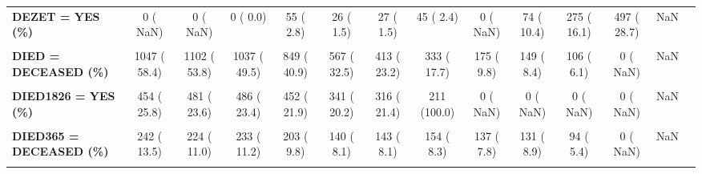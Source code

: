 \documentclass[
]{article}
\begin{document}
\begin{table}[H]
\begin{tabular}[t]{>{\raggedright\arraybackslash}p{5em}ccccccccccccc}
\textbf{DEZET = YES (\%)} & 0 (  NaN) & 0 (  NaN) & 0 (  0.0) & 55 (  2.8) & 26 (  1.5) & 27 (  1.5) & 45 (  2.4) & 0 (  NaN) & 74 ( 10.4) & 275 ( 16.1) & 497 ( 28.7) & NaN & \\
\textbf{\cellcolor{gray!10}{DFIBR = YES (\%)}} & \cellcolor{gray!10}{53 (  3.4)} & \cellcolor{gray!10}{63 (  3.1)} & \cellcolor{gray!10}{100 (  4.8)} & \cellcolor{gray!10}{108 (  5.4)} & \cellcolor{gray!10}{101 (  5.9)} & \cellcolor{gray!10}{90 (  5.1)} & \cellcolor{gray!10}{62 (  3.3)} & \cellcolor{gray!10}{0 (  NaN)} & \cellcolor{gray!10}{43 (  6.3)} & \cellcolor{gray!10}{42 (  2.5)} & \cellcolor{gray!10}{18 (  1.0)} & \cellcolor{gray!10}{NaN} & \cellcolor{gray!10}{}\\
\textbf{DIED = DECEASED (\%)} & 1047 ( 58.4) & 1102 ( 53.8) & 1037 ( 49.5) & 849 ( 40.9) & 567 ( 32.5) & 413 ( 23.2) & 333 ( 17.7) & 175 (  9.8) & 149 (  8.4) & 106 (  6.1) & 0 (  NaN) & NaN & \\
\textbf{\cellcolor{gray!10}{DIED1095 = DECEASED (\%)}} & \cellcolor{gray!10}{349 ( 19.8)} & \cellcolor{gray!10}{361 ( 17.7)} & \cellcolor{gray!10}{355 ( 17.1)} & \cellcolor{gray!10}{316 ( 15.3)} & \cellcolor{gray!10}{254 ( 15.1)} & \cellcolor{gray!10}{228 ( 15.4)} & \cellcolor{gray!10}{262 ( 14.6)} & \cellcolor{gray!10}{0 (  NaN)} & \cellcolor{gray!10}{0 (  NaN)} & \cellcolor{gray!10}{0 (  NaN)} & \cellcolor{gray!10}{0 (  NaN)} & \cellcolor{gray!10}{NaN} & \cellcolor{gray!10}{}\\
\textbf{DIED1826 = YES (\%)} & 454 ( 25.8) & 481 ( 23.6) & 486 ( 23.4) & 452 ( 21.9) & 341 ( 20.2) & 316 ( 21.4) & 211 (100.0) & 0 (  NaN) & 0 (  NaN) & 0 (  NaN) & 0 (  NaN) & NaN & \\
\textbf{\cellcolor{gray!10}{DIED30 = DECEASED (\%)}} & \cellcolor{gray!10}{154 (  8.6)} & \cellcolor{gray!10}{112 (  5.5)} & \cellcolor{gray!10}{114 (  5.5)} & \cellcolor{gray!10}{96 (  4.6)} & \cellcolor{gray!10}{76 (  4.4)} & \cellcolor{gray!10}{75 (  4.2)} & \cellcolor{gray!10}{69 (  3.7)} & \cellcolor{gray!10}{54 (  3.0)} & \cellcolor{gray!10}{73 (  4.3)} & \cellcolor{gray!10}{44 (  2.5)} & \cellcolor{gray!10}{32 (  2.7)} & \cellcolor{gray!10}{<0.001} & \cellcolor{gray!10}{}\\
\textbf{DIED365 = DECEASED (\%)} & 242 ( 13.5) & 224 ( 11.0) & 233 ( 11.2) & 203 (  9.8) & 140 (  8.1) & 143 (  8.1) & 154 (  8.3) & 137 (  7.8) & 131 (  8.9) & 94 (  5.4) & 0 (  NaN) & NaN & \\
\textbf{\cellcolor{gray!10}{DIED3652 = YES (\%)}} & \cellcolor{gray!10}{688 ( 39.0)} & \cellcolor{gray!10}{825 ( 40.6)} & \cellcolor{gray!10}{808 ( 39.0)} & \cellcolor{gray!10}{764 ( 37.2)} & \cellcolor{gray!10}{196 (100.0)} & \cellcolor{gray!10}{183 (100.0)} & \cellcolor{gray!10}{211 (100.0)} & \cellcolor{gray!10}{0 (  NaN)} & \cellcolor{gray!10}{0 (  NaN)} & \cellcolor{gray!10}{0 (  NaN)} & \cellcolor{gray!10}{0 (  NaN)} & \cellcolor{gray!10}{NaN} & \cellcolor{gray!10}{}\\

\end{tabular}
\end{table}
\end{document}
